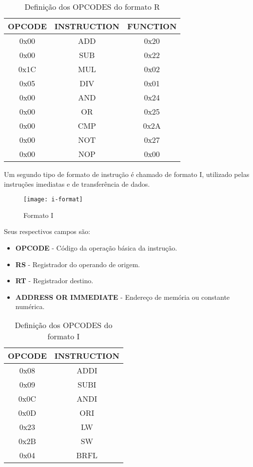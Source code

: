 \begin{table}[H]
\centering
	\begin{tabular}{|c|c|c|}
  	\hline 
  	\cellcolor[gray]{0.9}\textbf{OPCODE} & \cellcolor[gray]{0.9}\textbf{INSTRUCTION} & \cellcolor[gray]{0.9}\textbf{FUNCTION} \\ 
  	\hline 
  	0x00 & ADD & 0x20 \\ 
  	\hline 
  	0x00 & SUB & 0x22 \\ 
  	\hline 
  	0x1C & MUL & 0x02 \\ 
  	\hline 
  	0x05 & DIV & 0x01 \\ 
  	\hline 
  	0x00 & AND & 0x24 \\ 
  	\hline 
  	0x00 & OR & 0x25 \\ 
  	\hline 
  	0x00 & CMP & 0x2A \\ 
  	\hline 
  	0x00 & NOT & 0x27 \\ 
  	\hline
  	0x00 & NOP & 0x00 \\
  	\hline 
  	\end{tabular} 
  	\caption{Definição dos OPCODES do formato R}
  \end{table} 
  	 	
  	
	 Um segundo tipo de formato de instrução é chamado de formato I, utilizado pelas instruções imediatas e de transferência de dados.
	\begin{figure}[H]
    	\centering
    	\texttt{[image: i-format]}
    	\caption{Formato I}
		\label{i_format}
  	\end{figure}
Seus respectivos campos são:
	\begin{itemize}
	\item \textbf{OPCODE} - Código da operação básica da instrução.
	\item \textbf{RS} - Registrador do operando de origem.
	\item \textbf{RT} - Registrador destino.
	\item \textbf{ADDRESS OR IMMEDIATE} - Endereço de memória ou constante numérica.
\end{itemize}	  	

\begin{table}[H]
\centering	
\begin{tabular}{|c|c|}
	\hline 
  	\cellcolor[gray]{0.9}\textbf{OPCODE} & \cellcolor[gray]{0.9}\textbf{INSTRUCTION} \\ 
	\hline 
	0x08 & ADDI \\ 
	\hline 
	0x09 & SUBI \\ 
	\hline 
	0x0C & ANDI \\ 
	\hline 
	0x0D & ORI \\ 
	\hline
	0x23 & LW \\ 
	\hline 
	0x2B & SW \\
	\hline
	0x04 & BRFL \\ 
  	\hline 
	\end{tabular} 
	  	\caption{Definição dos OPCODES do formato I}	
\end{table}	
	
